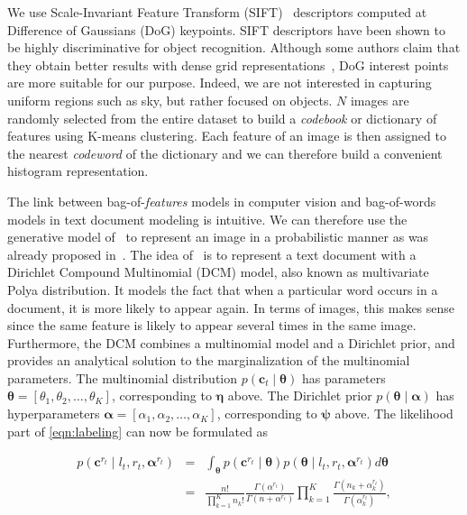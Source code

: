 We use Scale-Invariant Feature Transform (SIFT)~\cite{lowe04distinctive}
descriptors computed at Difference of Gaussians (DoG) keypoints. SIFT
descriptors have been shown to be highly discriminative for object recognition.
Although some authors claim that they obtain better results with dense grid
representations~\cite{feifei05bayesian}, DoG interest points are more suitable
for our purpose. Indeed, we are not interested in capturing uniform regions such
as sky, but rather focused on objects. $N$ images are randomly selected from the
entire dataset to build a \emph{codebook} or dictionary of features using
K-means clustering. Each feature of an image is then assigned to the nearest
\emph{codeword} of the dictionary and we can therefore build a convenient
histogram representation.

The link between bag-of-\emph{features} models in computer vision and
bag-of-words models in text document modeling is intuitive. We can therefore use
the generative model of~\cite{madsen05modeling} to represent an image in a
probabilistic manner as was already proposed in~\cite{ranganathan09bayesian}.
The idea of~\cite{madsen05modeling} is to represent a text document with a
Dirichlet Compound Multinomial (DCM) model, also known as multivariate Polya
distribution. It models the fact that when a particular word occurs in a
document, it is more likely to appear again. In terms of images, this makes
sense since the same feature is likely to appear several times in the same
image. Furthermore, the DCM combines a multinomial model and a Dirichlet prior,
and provides an analytical solution to the marginalization of the multinomial
parameters. The multinomial distribution $p(\mathbf{c}_t\mid
\boldsymbol{\theta})$ has parameters $\boldsymbol{\theta}=[\theta_1,\theta_2,
\dots,\theta_K]$, corresponding to $\boldsymbol{\eta}$ above. The Dirichlet
prior $p(\boldsymbol{\theta}\mid\boldsymbol{\alpha})$ has hyperparameters
$\boldsymbol{\alpha}=[\alpha_1,\alpha_2,\dots,\alpha_K]$, corresponding to
$\boldsymbol{\psi}$ above. The likelihood part of \eqref{eqn:labeling} can now
be formulated as

\begin{eqnarray}
\label{eqn:polya}
p(\mathbf{c}^{r_t}\mid l_t,r_t,\boldsymbol{\alpha}^{r_t})&=&
\int_{\boldsymbol{\theta}}
p(\mathbf{c}^{r_t}\mid\boldsymbol{\theta})p(\boldsymbol{\theta}\mid
l_t,r_t,\boldsymbol{\alpha}^{r_t})d\boldsymbol{\theta}\\\nonumber
&=&\frac{n!}{\prod_{k=1}^K n_k!}\frac{\Gamma(\alpha^{r_t})}
{\Gamma(n+\alpha^{r_t})}\prod_{k=1}^K\frac{\Gamma(n_k+\alpha^{r_t}_k)}
{\Gamma(\alpha^{r_t}_k)},
\end{eqnarray}

